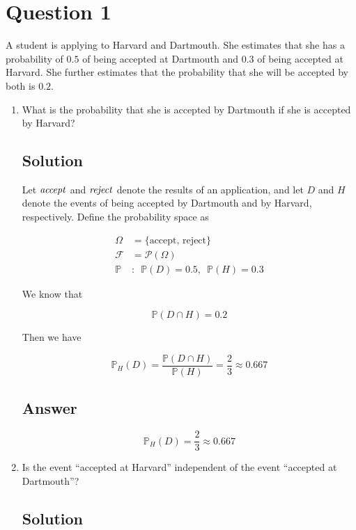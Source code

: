 \documentclass[12pt]{article}
\newcommand{\bP}{\mathbb{P}}
\begin{document}
	
	\section*{Question 1}
	
	\noindent A student is applying to Harvard and Dartmouth. She estimates that she has a probability of $0.5$ of being accepted at Dartmouth and $0.3$ of being accepted at Harvard. She further estimates that the probability that she will be accepted by both is $0.2$.
	
	\bigskip
	
	\begin{enumerate}[start=1,label={\bfseries Part \arabic*:},leftmargin=0in]
		\bigskip\item What is the probability that she is accepted by Dartmouth if she is accepted by Harvard?
		
		\subsection*{Solution}
		
			Let $\it{accept}$ and $\it{reject}$ denote the results of an application, and let $D$ and $H$ denote the events of being accepted by Dartmouth and by Harvard, respectively. Define the probability space as
		
			\[
			\begin{aligned}
				\Omega &= \{\mathrm{accept},\,\mathrm{reject}\}\\
				\mathcal{F} &= \mathcal{P}(\Omega)\\
				\bP &:\enspace \bP(D) = 0.5,\enspace \bP(H) = 0.3
			\end{aligned}
			\]
			
			We know that
			
			\[\bP(D\cap H) = 0.2\]
			
			Then we have
			
			\[\bP_H(D) = \frac{\bP(D\cap H)}{\bP(H)} = \frac{2}{3} \approx 0.667\]
		
		\subsection*{Answer}
		
			\[\boxed{\bP_H(D) = \frac{2}{3} \approx 0.667}\]
		
		\bigskip\item Is the event “accepted at Harvard” independent of the event “accepted at Dartmouth”?
		
		\subsection*{Solution}
		

\end{enumerate}
\end{document}
